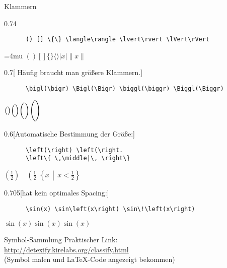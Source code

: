 \begin{frame}[fragile]{Klammern}
  \vspace{-1.5em}
  \begin{CodeExample}{0.74}
    \begin{lstlisting}
      () [] \{\} \langle\rangle \lvert\rvert \lVert\rVert
    \end{lstlisting}
  \CodeResult
    \Umathcloseopenspacing\textstyle=4mu
    $() [] \{\} \langle\rangle \lvert x\rvert \lVert x\rVert$
  \end{CodeExample}

  \begin{CodeExample}{0.7}[ Häufig braucht man größere Klammern.]
    \begin{lstlisting}
      \bigl(\bigr) \Bigl(\Bigr) \biggl(\biggr) \Biggl(\Biggr)
    \end{lstlisting}
  \CodeResult
    $\bigl(\bigr) \Bigl(\Bigr) \biggl(\biggr) \Biggl(\Biggr)$ 
  \end{CodeExample}

  \begin{CodeExample}{0.6}[Automatische Bestimmung der Größe:]
    \begin{lstlisting}
      \left(\right) \left(\right.
      \left\{ \,\middle|\, \right\}
    \end{lstlisting}
  \CodeResult
    $\left(\frac{1}{2}\right) \quad \left(\frac{1}{2}\right.$ 
    $\left\{ x \,\middle|\, x < \frac{1}{2} \right\}$
  \end{CodeExample}
  
  \begin{CodeExample}{0.705}[hat kein optimales Spacing:]
    \begin{lstlisting}
      \sin(x) \sin\left(x\right) \sin\!\left(x\right)
    \end{lstlisting}
  \CodeResult
    $\sin(x) \sin\left(x\right) \sin\!\left(x\right)$
  \end{CodeExample}
\end{frame}

\begin{frame}[fragile]{
  Symbol-Sammlung
  \hfill{}
  \hfill{}
}
  Praktischer Link: \\
  \url{http://detexify.kirelabs.org/classify.html} \\
  (Symbol malen und \LaTeX-Code angezeigt bekommen)
\end{frame}

